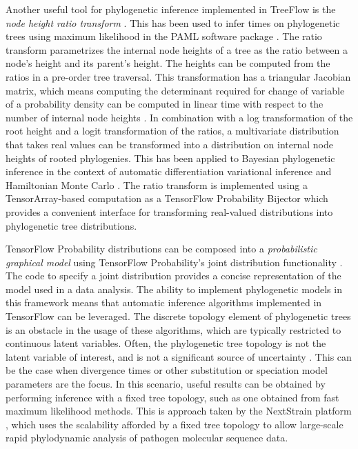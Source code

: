 Another useful tool for phylogenetic inference implemented in TreeFlow is the \textit{node height ratio transform} \cite{kishino2001performance}. This has been used to infer times on phylogenetic trees using maximum likelihood in the PAML software package \cite{yang2007paml}. The ratio transform parametrizes the internal node heights of a tree as the ratio between a node's height and its parent's height. The heights can be computed from the ratios in a pre-order tree traversal. This transformation has a triangular Jacobian matrix, which means computing the determinant required for change of variable of a probability density can be computed in linear time with respect to the number of internal node heights \cite{fourment2019evaluating}. In combination with a log transformation of the root height and a logit transformation of the ratios, a multivariate distribution that takes real values can be transformed into a distribution on internal node heights of rooted phylogenies. This has been applied to Bayesian phylogenetic inference in the context of automatic differentiation variational inference \cite{fourment2019evaluating} and Hamiltonian Monte Carlo \cite{ji2021scalable}. The ratio transform is implemented using a TensorArray-based computation as a TensorFlow Probability Bijector which provides a convenient interface for transforming real-valued distributions into phylogenetic tree distributions.

TensorFlow Probability distributions can be composed into a \textit{probabilistic graphical model} using TensorFlow Probability's joint distribution functionality \cite{piponi2020joint}. The code to specify a joint distribution provides a concise representation of the model used in a data analysis. The ability to implement phylogenetic models in this framework means that automatic inference algorithms implemented in TensorFlow can be leveraged. The discrete topology element of phylogenetic trees is an obstacle in the usage of these algorithms, which are typically restricted to continuous latent variables. Often, the phylogenetic tree topology is not the latent variable of interest, and is not a significant source of uncertainty \cite{yang2000codon}. This can be the case when divergence times or other substitution or speciation model parameters are the focus. In this scenario, useful results can be obtained by performing inference with a fixed tree topology, such as one obtained from fast maximum likelihood methods. This is approach taken by the NextStrain platform \cite{hadfield2018nextstrain}, which uses the scalability afforded by a fixed tree topology to allow large-scale rapid phylodynamic analysis of pathogen molecular sequence data.

